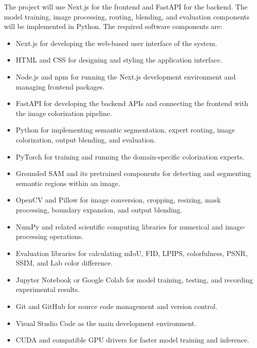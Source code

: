 \documentclass{FastFyp}
\begin{document}
The project will use Next.js for the frontend and FastAPI for the backend. The model training, image processing, routing, blending, and evaluation components will be implemented in Python. The required software components are:

\begin{itemize}
    \item Next.js for developing the web-based user interface of the system.
    
    \item HTML and CSS for designing and styling the application interface.
    
    \item Node.js and npm for running the Next.js development environment and managing frontend packages.
    
    \item FastAPI for developing the backend APIs and connecting the frontend with the image colorization pipeline.
    
    \item Python for implementing semantic segmentation, expert routing, image colorization, output blending, and evaluation.
    
    \item PyTorch for training and running the domain-specific colorization experts.
    
    \item Grounded SAM and its pretrained components for detecting and segmenting semantic regions within an image.
    
    \item OpenCV and Pillow for image conversion, cropping, resizing, mask processing, boundary expansion, and output blending.
    
    \item NumPy and related scientific computing libraries for numerical and image-processing operations.
    
    \item Evaluation libraries for calculating mIoU, FID, LPIPS, colorfulness, PSNR, SSIM, and Lab color difference.
    
    \item Jupyter Notebook or Google Colab for model training, testing, and recording experimental results.
    
    \item Git and GitHub for source code management and version control.
    
    \item Visual Studio Code as the main development environment.
    
    \item CUDA and compatible GPU drivers for faster model training and inference.
\end{itemize}
\end{document}
